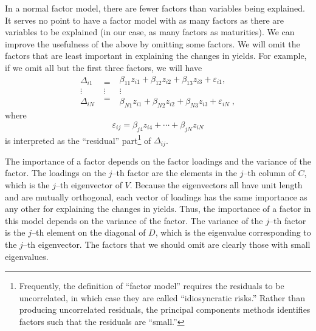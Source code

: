 In a normal factor model, there are fewer factors than variables being explained.  It serves no point to have a factor model with as many factors as there are variables to be explained (in our case, as many factors as maturities).  We can improve the usefulness of the above by omitting some factors.  We will omit the factors that are least important in explaining the changes in yields.  For example, if we omit all but the first three factors, we will have
\begin{equation}\label{pc32}\begin{matrix} \varDelta_{i1} \\ \vdots \\ \varDelta_{iN} \end{matrix} 
\;\begin{matrix}= \\ \vdots \\ = \end{matrix}\;
\begin{matrix} \beta_{11}z_{i1} + \beta_{12}z_{i2}+ \beta_{13}z_{i3} +\varepsilon_{i1}, \\ \vdots \\ \beta_{N1}z_{i1} + \beta_{N2}z_{i2}+ \beta_{N3}z_{i3} +\varepsilon_{iN}\; ,\end{matrix}\end{equation}
where 
\begin{equation}\label{principalcomponentsresiduals}
\varepsilon_{ij} = \beta_{j4}z_{i4} + \cdots + \beta_{jN}z_{iN}
\end{equation}
is interpreted   as the ``residual'' part\footnote{Frequently, the definition of ``factor model'' requires the residuals to be uncorrelated, in which case they are called ``idiosyncratic risks.''   Rather than producing uncorrelated residuals, the principal components methods identifies factors such that the residuals are ``small.''} of $\varDelta_{ij}$.

The importance of a factor depends on the factor loadings and the variance of the factor.  The loadings on the $j$--th factor are the elements in the $j$--th column of $C$, which is the $j$--th eigenvector of $V$.   Because the eigenvectors all have unit length and are mutually orthogonal, each vector of loadings has the same importance as any other for explaining the changes in yields.  Thus, the importance of a factor in this model depends on the variance of the factor.  The variance of the $j$--th factor is the $j$--th element on the diagonal of $D$, which is the eigenvalue corresponding to the $j$--th eigenvector.  The factors that we should omit are clearly those with small eigenvalues.  


